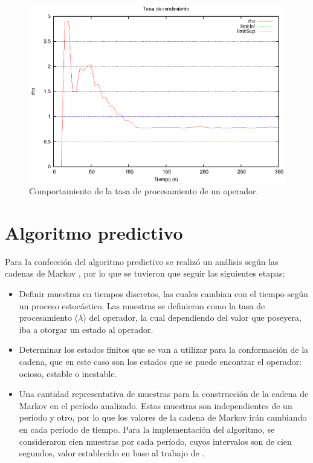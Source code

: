 \begin{figure}[hb!]
  \centering
    \includegraphics[scale=0.8]{images/Umbrales.eps}
  \caption{Comportamiento de la tasa de procesamiento de un operador.}
  \label{fig:umbrales}
\end{figure}


\section{Algoritmo predictivo}
Para la confección del algoritmo predictivo se realizó un análisis según las cadenas de Markov \citep{ching2006markov}, por lo que se tuvieron que seguir las siguientes etapas:

\begin{itemize}
	\item Definir muestras en tiempos discretos, las cuales cambian con el tiempo según un proceso estocástico. Las muestras se definieron como la tasa de procesamiento ($\lambda$) del operador, la cual dependiendo del valor que poseyera, iba a otorgar un estado al operador.
	\item Determinar los estados finitos que se van a utilizar para la conformación de la cadena, que en este caso son los estados que se puede encontrar el operador: ocioso, estable o inestable.
	\item Una cantidad representativa de muestras para la construcción de la cadena de Markov en el período analizado. Estas muestras son independientes de un período y otro, por lo que los valores de la cadena de Markov irán cambiando en cada período de tiempo. Para la implementación del algoritmo, se consideraron cien muestras por cada período, cuyos intervalos son de cien segundos, valor establecido en base al trabajo de \citep{GongGW10}.
\end{itemize}

